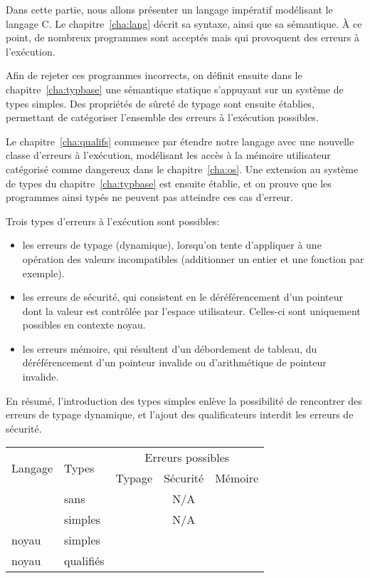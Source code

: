 \begin{headingpage}
Dans cette partie, nous allons présenter un langage impératif modélisant le
langage C. Le chapitre~\ref{cha:lang} décrit sa syntaxe, ainsi que sa
sémantique. À ce point, de nombreux programmes sont acceptés mais qui provoquent
des erreurs à l'exécution.

Afin de rejeter ces programmes incorrects, on définit ensuite dans le
chapitre~\ref{cha:typbase} une sémantique statique s'appuyant sur un système de
types simples. Des propriétés de sûreté de typage sont ensuite établies,
permettant de catégoriser l'ensemble des erreurs à l'exécution possibles.

Le chapitre~\ref{cha:qualifs} commence par étendre notre langage avec une
nouvelle classe d'erreurs à l'exécution, modélisant les accès à la mémoire
utilisateur catégorisé comme dangereux dans le chapitre~\ref{cha:os}. Une
extension au système de types du chapitre~\ref{cha:typbase} est ensuite établie,
et on prouve que les programmes ainsi typés ne peuvent pas atteindre ces cas
d'erreur.

Trois types d'erreurs à l'exécution sont possibles:

\begin{itemize}
\item
  les erreurs de typage (dynamique), lorsqu'on tente d'appliquer à une
  opération des valeurs incompatibles (additionner un entier et une
  fonction par exemple).
\item
  les erreurs de sécurité, qui consistent en le déréférencement d'un
  pointeur dont la valeur est contrôlée par l'espace utilisateur.
  Celles-ci sont uniquement possibles en contexte noyau.
\item
  les erreurs mémoire, qui résultent d'un débordement de tableau, du
  déréférencement d'un pointeur invalide ou d'arithmétique de pointeur
  invalide.
\end{itemize}

En résumé, l'introduction des types simples enlève la possibilité de rencontrer
des erreurs de typage dynamique, et l'ajout des qualificateurs interdit les
erreurs de sécurité.

\begin{center}
\begin{tabular}{ll@{\hskip 15mm}ccc}
\toprule
\multirow{2}{*}{Langage} & \multirow{2}{*}{Types}  & \multicolumn{3}{c}{Erreurs possibles}   \\
                         &  & Typage      & Sécurité    & Mémoire     \\
\midrule
\langname{}       & sans      & \CheckedBox{} & N/A           & \CheckedBox{} \\
\langname{}       & simples   & \Square{}     & N/A           & \CheckedBox{} \\
\langname{} noyau & simples   & \Square{}     & \CheckedBox{} & \CheckedBox{} \\
\langname{} noyau & qualifiés & \Square{}     & \Square{}     & \CheckedBox{} \\
\bottomrule
\end{tabular}


\end{center}
\end{headingpage}
